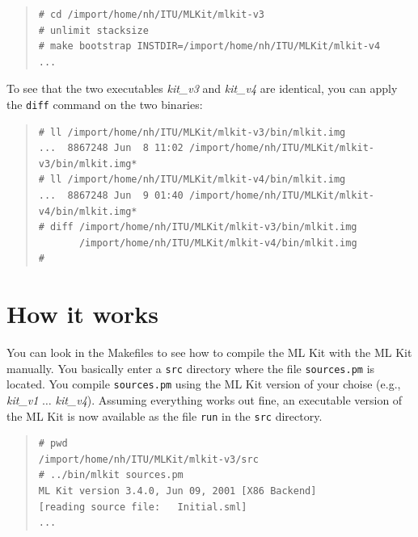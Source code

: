 \documentclass[12pt]{book}
\begin{document}
\begin{small}
\begin{quote}
\begin{verbatim}
# cd /import/home/nh/ITU/MLKit/mlkit-v3
# unlimit stacksize
# make bootstrap INSTDIR=/import/home/nh/ITU/MLKit/mlkit-v4
...
\end{verbatim}
\end{quote}
\end{small}

To see that the two executables \emph{kit\_v3} and \emph{kit\_v4} are
identical, you can apply the \texttt{diff} command on the two
binaries:

\begin{small}
\begin{quote}
\begin{verbatim}
# ll /import/home/nh/ITU/MLKit/mlkit-v3/bin/mlkit.img 
...  8867248 Jun  8 11:02 /import/home/nh/ITU/MLKit/mlkit-v3/bin/mlkit.img*
# ll /import/home/nh/ITU/MLKit/mlkit-v4/bin/mlkit.img
...  8867248 Jun  9 01:40 /import/home/nh/ITU/MLKit/mlkit-v4/bin/mlkit.img*
# diff /import/home/nh/ITU/MLKit/mlkit-v3/bin/mlkit.img 
       /import/home/nh/ITU/MLKit/mlkit-v4/bin/mlkit.img
#
\end{verbatim}
\end{quote}
\end{small}

\section{How it works}

You can look in the Makefiles to see how to compile the ML Kit with
the ML Kit manually. You basically enter a \texttt{src} directory
where the file \texttt{sources.pm}
 is located. You compile
\texttt{sources.pm} using the ML Kit version of your choise (e.g.,
\emph{kit\_v1} $\ldots$ \emph{kit\_v4}). Assuming everything works out
fine, an executable version of the ML Kit is now available as the file
{\tt run} in the \texttt{src} directory.


\begin{small}
\begin{quote}
\begin{verbatim}
# pwd
/import/home/nh/ITU/MLKit/mlkit-v3/src
# ../bin/mlkit sources.pm
ML Kit version 3.4.0, Jun 09, 2001 [X86 Backend]
[reading source file:   Initial.sml]
...
\end{verbatim}
\end{quote}
\end{small}
\end{document}
